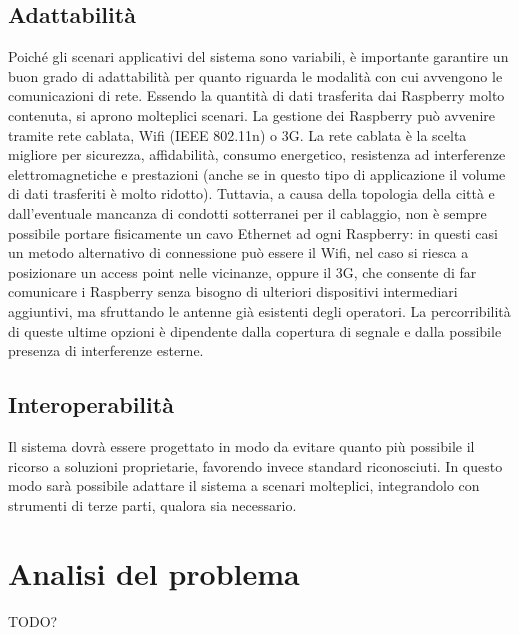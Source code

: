 \subsection{Adattabilità}
Poiché gli scenari applicativi del sistema sono variabili, è importante garantire un buon grado di adattabilità per quanto riguarda le modalità con cui avvengono le comunicazioni di rete. Essendo la quantità di dati trasferita dai Raspberry molto contenuta, si aprono molteplici scenari. La gestione dei Raspberry può avvenire tramite rete cablata, Wifi (IEEE 802.11n) o 3G. La rete cablata è la scelta migliore per sicurezza, affidabilità, consumo energetico, resistenza ad interferenze elettromagnetiche e prestazioni (anche se in questo tipo di applicazione il volume di dati trasferiti è molto ridotto). Tuttavia, a causa della topologia della città e dall’eventuale mancanza di condotti sotterranei per il cablaggio, non è sempre possibile portare fisicamente un cavo Ethernet ad ogni Raspberry: in questi casi un metodo alternativo di connessione può essere il Wifi, nel caso si riesca a posizionare un access point nelle vicinanze, oppure il 3G, che consente di far comunicare i Raspberry senza bisogno di ulteriori dispositivi intermediari aggiuntivi, ma sfruttando le antenne già esistenti degli operatori. La percorribilità di queste ultime opzioni è dipendente dalla copertura di segnale e dalla possibile presenza di interferenze esterne.
\subsection{Interoperabilità}
Il sistema dovrà essere progettato in modo da evitare quanto più possibile il ricorso a soluzioni proprietarie, favorendo invece standard riconosciuti. In questo modo sarà possibile adattare il sistema a scenari molteplici, integrandolo con strumenti di terze parti, qualora sia necessario.

\section{Analisi del problema}
TODO?
